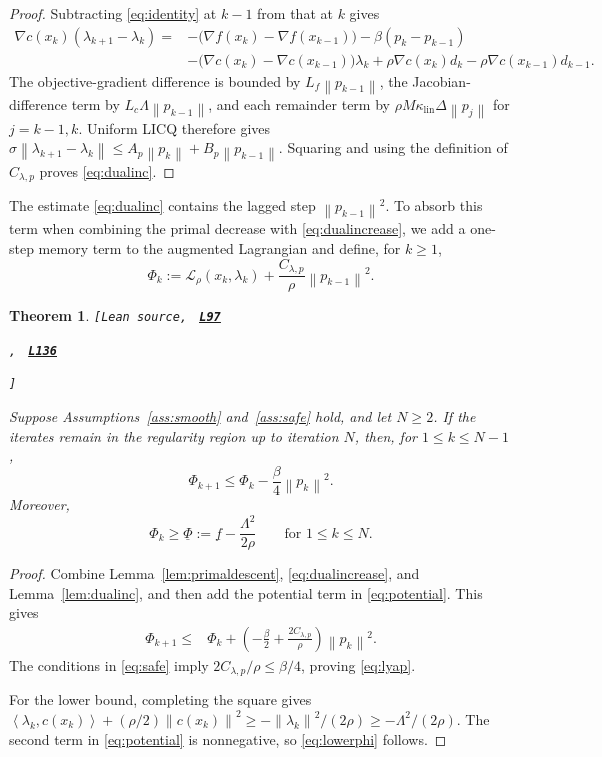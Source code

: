 \documentclass[11pt]{article}
\newtheorem{theorem}{Theorem}[section]
\theoremstyle{definition}
\theoremstyle{remark}
\numberwithin{equation}{section}
\numberwithin{figure}{section}
\numberwithin{table}{section}
\numberwithin{algorithm}{section}
\newcommand{\cL}{\mathcal{L}}
\newcommand{\norm}[1]{\left\lVert #1\right\rVert}
\newcommand{\ip}[2]{\left\langle #1,#2\right\rangle}
\newcommand{\grad}{\nabla}
\newcommand{\leanLinkText}[1]{%
  \underline{\textbf{#1}}%
}
\newcommand{\leanDeclTag}[2]{%
  {\footnotesize\texttt{[Lean source, }}%
  \href{https://github.com/optpku/ReasBook/blob/v4.32.2/ReasBook/Papers/TR_LALM_theory/#1?plain=1\#L#2}%
    {\leanLinkText{\footnotesize\texttt{L#2}}}%
}
\newcommand{\leanDeclTagExtra}[2]{%
  \unskip
  {\footnotesize\texttt{, }}%
  \href{https://github.com/optpku/ReasBook/blob/v4.32.2/ReasBook/Papers/TR_LALM_theory/#1?plain=1\#L#2}%
    {\leanLinkText{\footnotesize\texttt{L#2}}}\allowbreak
}
\newcommand{\leanDeclTagEnd}{%
  \unskip
  {\footnotesize\texttt{]}}\enspace
}
\begin{document}
\begin{proof}
Subtracting \eqref{eq:identity} at \(k-1\) from that at \(k\) gives
\begin{align*}
\grad c(x_k)(\lambda_{k+1}-\lambda_k)
={}&-\big(\grad f(x_k)-\grad f(x_{k-1})\big)
    -\beta(p_k-p_{k-1})\\
&-\big(\grad c(x_k)-\grad c(x_{k-1})\big)\lambda_k
+\rho\grad c(x_k)d_k
  -\rho\grad c(x_{k-1})d_{k-1}.
\end{align*}
The objective-gradient difference is bounded by
\(L_f\norm{p_{k-1}}\), the Jacobian-difference term by
\(L_c\Lambda\norm{p_{k-1}}\), and each remainder term by
\(\rho M\kappa_{\mathrm{lin}}\Delta\norm{p_j}\) for \(j=k-1,k\).
Uniform LICQ therefore gives
\(\sigma\norm{\lambda_{k+1}-\lambda_k}
\le A_p\norm{p_k}+B_p\norm{p_{k-1}}\).
Squaring and using the definition of \(C_{\lambda,p}\) proves
\eqref{eq:dualinc}.
\end{proof}

The estimate \eqref{eq:dualinc} contains the lagged step
$\norm{p_{k-1}}^2$.  To absorb this term when combining the primal decrease with \eqref{eq:dualincrease}, we add a one-step memory term to the augmented Lagrangian and define, for $k\geq1$,
\begin{equation}
    \Phi_k
    :=\cL_\rho(x_k,\lambda_k)
      +\frac{C_{\lambda,p}}{\rho}\norm{p_{k-1}}^2.
    \label{eq:potential}
\end{equation}

\begin{theorem}
\label{thm:lyap}
\leanDeclTag{Theorem_2_9.lean}{97}
\leanDeclTagExtra{Theorem_2_9.lean}{136}
\leanDeclTagEnd
Suppose Assumptions~\ref{ass:smooth} and~\ref{ass:safe} hold, and let $N\ge2$. If the iterates remain in the regularity region up to iteration $N$, then, for $1\le k\le N-1$,
\begin{equation}
    \Phi_{k+1}
    \le \Phi_k
      -\frac{\beta}{4}\norm{p_k}^2.
    \label{eq:lyap}
\end{equation}
Moreover,
\begin{equation}
    \Phi_k\ge
    \underline\Phi
    :=\underline{f}-\frac{\Lambda^2}{2\rho}
    \qquad \text{for }1\le k\le N.
    \label{eq:lowerphi}
\end{equation}
\end{theorem}

\begin{proof}
Combine Lemma~\ref{lem:primaldescent}, \eqref{eq:dualincrease}, and
Lemma~\ref{lem:dualinc}, and then add the potential term in
\eqref{eq:potential}.  This gives
\begin{align*}
    \Phi_{k+1}
    \le{}&\Phi_k
    +\left(-\frac\beta2+\frac{2C_{\lambda,p}}\rho\right)\norm{p_k}^2.
\end{align*}
The conditions in \eqref{eq:safe} imply
$2C_{\lambda,p}/\rho\le\beta/4$, proving \eqref{eq:lyap}.

For the lower bound, completing the square gives
\(\ip{\lambda_k}{c(x_k)}+(\rho/2)\norm{c(x_k)}^2
\ge-\norm{\lambda_k}^2/(2\rho)\ge-\Lambda^2/(2\rho)\).
The second term in \eqref{eq:potential} is nonnegative, so \eqref{eq:lowerphi} follows.
\end{proof}
\end{document}
